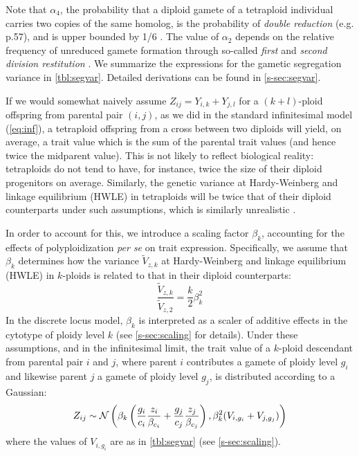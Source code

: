 \documentclass[11pt,a4paper]{article}
\begin{document}
Note that $\alpha_4$, the probability that a diploid gamete of a tetraploid
individual carries two copies of the same homolog, is the probability of
\textit{double reduction} (e.g. \cite{lynch1998} p.57), and is upper bounded by
1/6 \citep{stift2008}.
The value of $\alpha_2$ depends on the relative frequency of unreduced gamete
formation through so-called \textit{first} and \textit{second division
restitution} \citep{storme2013}.
We summarize the expressions for the gametic segregation variance in
\cref{tbl:segvar}.
Detailed derivations can be found in \cref{s-sec:segvar}.

If we would somewhat naively assume $Z_{ij} = Y_{i,k} + Y_{j,l}$ for a
$(k+l)$-ploid offspring from parental pair $(i,j)$, as we did in the standard
infinitesimal model (\cref{eq:inf}), 
a tetraploid offspring from a cross between two diploids will yield, on average,
a trait value which is the sum of the parental trait values (and hence twice
the midparent value).
This is not likely to reflect biological reality: tetraploids do not tend to
have, for instance, twice the size of their diploid progenitors on average.
Similarly, the genetic variance at Hardy-Weinberg and linkage equilibrium
(HWLE) in tetraploids will be twice that of their diploid counterparts under
such assumptions, which is similarly unrealistic \citep{clo2022}.

In order to account for this, we introduce a scaling factor $\beta_k$,
accounting for the effects of polyploidization \textit{per se} on trait expression.
Specifically, we assume that $\beta_k$ determines how the variance
$\tilde{V}_{z,k}$ at Hardy-Weinberg and linkage equilibrium (HWLE) in
$k$-ploids is related to that in their diploid counterparts:
\begin{equation}
  \frac{\tilde{V}_{z,k}}{\tilde{V}_{z,2}} = \frac{k}{2} \beta_{k}^2
\end{equation}
In the discrete locus model, $\beta_k$ is interpreted as a scaler of additive
effects in the cytotype of ploidy level $k$ (see \cref{s-sec:scaling} for
details).
Under these assumptions, and in the infinitesimal limit, the trait value of a
$k$-ploid descendant from parental pair $i$ and $j$, where parent $i$
contributes a gamete of ploidy level $g_i$ and likewise parent $j$ a gamete of
ploidy level $g_j$, is distributed according to a Gaussian:
\begin{equation}
  Z_{ij} \sim \mathcal{N}\left(
    \beta_{k} \left(
          \frac{g_i}{c_i}\frac{z_i}{\beta_{c_i}} 
        + \frac{g_j}{c_j}\frac{z_j}{\beta_{c_j}}\right), 
    \beta_{k}^2 (V_{i,g_i} + V_{j,g_j})\right)
   \label{eq:oneline}
\end{equation}
where the values of $V_{i,g_{i}}$ are as in \cref{tbl:segvar} (see
\cref{s-sec:scaling}).
\end{document}
